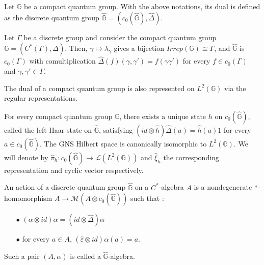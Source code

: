 \begin{definition}
Let $\mathbb G$ be a compact quantum group. With the above notations, its dual is defined as the discrete quantum group $\hat{\mathbb G} = (c_0(\hat{\mathbb G}),\hat\Delta)$.
\end{definition}

\begin{Expl} Let $\Gamma$ be a discrete group and consider the compact quantum group $\mathbb G=(C^*(\Gamma),\Delta)$. Then, $\gamma\mapsto \lambda_\gamma$ gives a bijection $Irrep(\mathbb G)\cong \Gamma$, and $\hat{\mathbb G}$ is $c_0(\Gamma)$ with comultiplication $\hat\Delta (f)(\gamma,\gamma') = f(\gamma\gamma')$ for every $f\in c_0(\Gamma)$ and $\gamma,\gamma'\in\Gamma$.
\end{Expl}

The dual of a compact quantum group is also represented on $L^2(\mathbb G)$ via the regular representations. 
\begin{prop}
For every compact quantum group $\mathbb G$, there exists a unique state $h$ on $c_0(\hat{\mathbb G})$, called the left Haar state on $\hat{\mathbb G}$, satisfying $(id\otimes \hat h)\hat\Delta(a) = \hat h(a)1 $ for every $a\in c_0(\hat{\mathbb G})$. The GNS Hilbert space is canonically isomorphic to $L^2(\mathbb G)$. We will denote by $\hat \pi_h : c_0(\hat{\mathbb G})\rightarrow \mathcal L(L^2(\mathbb G))$ and $\hat \xi_h$ the corresponding representation and cyclic vector respectively.  
\end{prop}


\begin{definition} An action of a discrete quantum group $\hat{\mathbb G}$ on a $C^*$-algebra $A$ is a nondegenerate $*$-homomorphism $A\rightarrow \mathcal M(A\otimes c_0(\hat{\mathbb G}))$ such that :
\begin{itemize}
\item[$\bullet$] $(\alpha \otimes id )\alpha = (id\otimes \hat\Delta) \alpha$
\item[$\bullet$] for every $a\in A$, $(\hat\varepsilon \otimes id)\alpha(a) = a$.
\end{itemize}
Such a pair $(A,\alpha)$ is called a $\hat{\mathbb G}$-algebra.
\end{definition}

